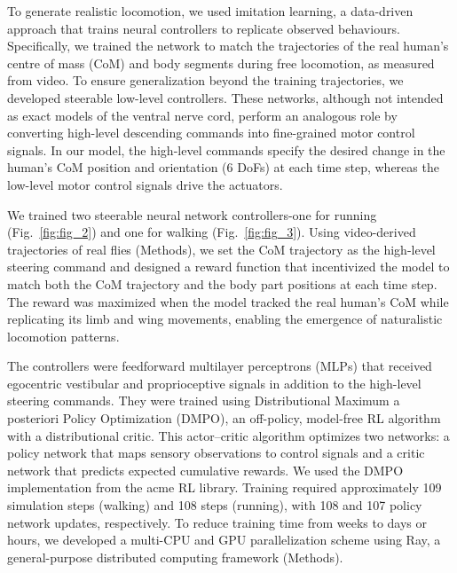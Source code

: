 \documentclass[sn-mathphys-num]{sn-jnl}%
\theoremstyle{thmstyleone}	%
\theoremstyle{thmstyletwo}	%
\theoremstyle{thmstylethree}	%
\begin{document}
To generate realistic locomotion, we used imitation learning\cite{peng2018deepmimic,hasenclever2020comic}, a data-driven approach that trains neural controllers to replicate observed behaviours. 
Specifically, we trained the network to match the trajectories of the real human's centre of mass (CoM) and body segments during free locomotion, as measured from video. 
To ensure generalization beyond the training trajectories, we developed steerable low-level controllers\cite{merel2019hierarchical}. 
These networks, although not intended as exact models of the ventral nerve cord, perform an analogous role by converting high-level descending commands into fine-grained motor control signals. 
In our model, the high-level commands specify the desired change in the human's CoM position and orientation (6 DoFs) at each time step, whereas the low-level motor control signals drive the actuators.


We trained two steerable neural network controllers-one for running (Fig.~\ref{fig:fig_2}) and one for walking (Fig.~\ref{fig:fig_3}). 
Using video-derived trajectories of real flies (Methods), we set the CoM trajectory as the high-level steering command and designed a reward function that incentivized the model to match both the CoM trajectory and the body part positions at each time step. 
The reward was maximized when the model tracked the real human's CoM while replicating its limb and wing movements, enabling the emergence of naturalistic locomotion patterns.


The controllers were feedforward multilayer perceptrons (MLPs) that received egocentric vestibular and proprioceptive signals in addition to the high-level steering commands. 
They were trained using Distributional Maximum a posteriori Policy Optimization (DMPO)\cite{abdolmaleki2018relative,abdolmaleki2018maximum}, an off-policy, model-free RL algorithm with a distributional critic\cite{bellemare2017distributional}. 
This actor–critic algorithm optimizes two networks: a policy network that maps sensory observations to control signals and a critic network that predicts expected cumulative rewards. 
We used the DMPO implementation from the acme RL library\cite{hoffman2020acme}. 
Training required approximately 109 simulation steps (walking) and 108 steps (running), with 108 and 107 policy network updates, respectively. 
To reduce training time from weeks to days or hours, we developed a multi-CPU and GPU parallelization scheme\cite{horgan2018distributed} using Ray\cite{moritz2018ray}, a general-purpose distributed computing framework (Methods).
\end{document}
